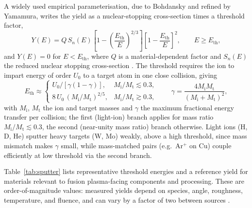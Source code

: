 A widely used empirical parameterisation, due to Bohdansky and refined by Yamamura, writes the yield as a nuclear-stopping cross-section times a threshold factor,
\begin{equation}
Y(E) = Q \, S_{n}(E) \left[1 - \left(\frac{E_{\mathrm{th}}}{E}\right)^{2/3}\right]\left[1 - \frac{E_{\mathrm{th}}}{E}\right]^{2},
\qquad E \geq E_{\mathrm{th}},
\label{appD-eq:bohdansky}
\end{equation}
and $Y(E)=0$ for $E<E_{\mathrm{th}}$, where $Q$ is a material-dependent factor and $S_n(E)$ the reduced nuclear stopping cross-section \cite{ref0144}. The threshold requires the ion to impart energy of order $U_0$ to a target atom in one close collision, giving
\begin{equation}
E_{\mathrm{th}} \approx
\begin{cases}
U_0/[\gamma(1-\gamma)], & M_{\mathrm{i}}/M_{\mathrm{t}} \lesssim 0.3, \\[2pt]
8\,U_0\,(M_{\mathrm{i}}/M_{\mathrm{t}})^{2/5}, & M_{\mathrm{i}}/M_{\mathrm{t}} \gtrsim 0.3,
\end{cases}
\qquad
\gamma = \frac{4 M_{\mathrm{i}} M_{\mathrm{t}}}{(M_{\mathrm{i}}+M_{\mathrm{t}})^{2}},
\label{eq:ethresh}
\end{equation}
with $M_{\mathrm{i}}$, $M_{\mathrm{t}}$ the ion and target masses and $\gamma$ the maximum fractional energy transfer per collision; the first (light-ion) branch applies for mass ratio $M_{\mathrm{i}}/M_{\mathrm{t}} \lesssim 0.3$, the second (near-unity mass ratio) branch otherwise. Light ions (H, D, He) sputter heavy targets (W, Mo) weakly, above a high threshold, since mass mismatch makes $\gamma$ small, while mass-matched pairs (e.g.\ Ar$^+$ on Cu) couple efficiently at low threshold via the second branch.

Table~\ref{tab:sputter} lists representative threshold energies and a reference yield for materials relevant to fusion plasma-facing components and processing. These are order-of-magnitude values: measured yields depend on species, angle, roughness, temperature, and fluence, and can vary by a factor of two between sources \cite{ref0152,ref0158}.

